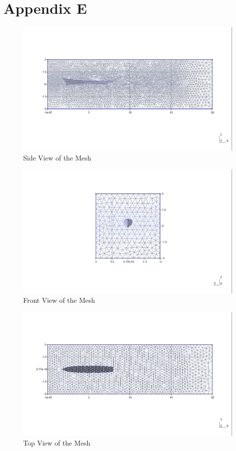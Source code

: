 \documentclass[12pt]{article} %
\begin{document}
\section{Appendix E}
\begin{figure}[ht]
    \centering
    \includegraphics[width=1\textwidth]{Mesh_3.png}
    \caption{Side View of the Mesh}
\end{figure}
\begin{figure}[ht]
    \centering
    \includegraphics[width=1\textwidth]{Mesh_2.png}
    \caption{Front View of the Mesh}
\end{figure}
\begin{figure}[ht]
    \centering
    \includegraphics[width=1\textwidth]{Mesh_4.png}
    \caption{Top View of the Mesh}
\end{figure}
\end{document}
